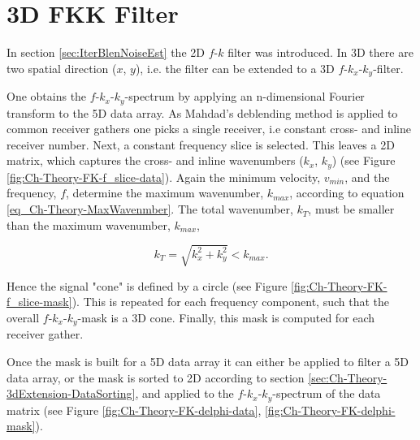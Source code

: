 \section{3D FKK Filter} \label{sec:Ch-Theory-3dExtension-FKK}

In section \ref{sec:IterBlenNoiseEst} the 2D $f$-$k$ filter was introduced. In 3D there are two spatial direction ($x$, $y$), i.e. the filter can be extended to a 3D $f$-$k_x$-$k_y$-filter.

One obtains the $f$-$k_x$-$k_y$-spectrum by applying an n-dimensional Fourier transform to the 5D data array. As Mahdad's deblending method is applied to common receiver gathers one picks a single receiver, i.e constant cross- and inline receiver number. Next, a constant frequency slice is selected. This leaves a 2D matrix, which captures the cross- and inline wavenumbers ($k_x$, $k_y$) (see Figure \ref{fig:Ch-Theory-FK-f_slice-data}). Again the minimum velocity, $v_{min}$, and the frequency, $f$, determine the maximum wavenumber, $k_{max}$, according to equation \ref{eq_Ch-Theory-MaxWavenmber}. The total wavenumber, $k_{T}$, must be smaller than the maximum wavenumber, $k_{max}$,

\begin{equation}
	k_{T} = \sqrt{k_x^2 + k_{y}^2} < k_{max}.
	\label{eq:Ch-Theory-TotalWavenumber}
\end{equation}

Hence the signal "cone" is defined by a circle (see Figure \ref{fig:Ch-Theory-FK-f_slice-mask}). This is repeated for each frequency component, such that the overall $f$-$k_x$-$k_y$-mask is a 3D cone. Finally, this mask is computed for each receiver gather.

Once the mask is built for a 5D data array it can either be applied to filter a 5D data array, or the mask is sorted to 2D according to section \ref{sec:Ch-Theory-3dExtension-DataSorting}, and applied to the $f$-$k_x$-$k_y$-spectrum of the data matrix (see Figure \ref{fig:Ch-Theory-FK-delphi-data}, \ref{fig:Ch-Theory-FK-delphi-mask}).

